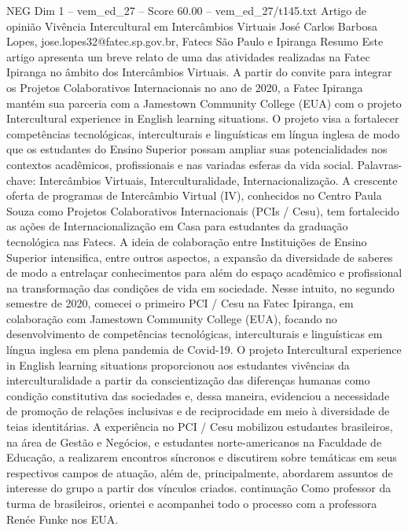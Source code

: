 \begin{textsample}{NEG Dim 1 – vem\_ed\_27 – Score 60.00 – vem\_ed\_27/t145.txt}  \label{ex:f1_neg_172}
Artigo de opinião Vivência Intercultural em Intercâmbios Virtuais José Carlos Barbosa Lopes, jose.lopes32@fatec.sp.gov.br, Fatecs São Paulo e Ipiranga Resumo Este artigo apresenta um breve relato de uma das atividades realizadas na Fatec Ipiranga no âmbito dos Intercâmbios Virtuais.
A partir do convite para integrar os Projetos Colaborativos Internacionais no ano de 2020, a Fatec Ipiranga mantém sua parceria com a Jamestown Community College (EUA) com o projeto Intercultural experience in English learning situations.
O projeto visa a fortalecer competências tecnológicas, interculturais e linguísticas em língua inglesa de modo que os estudantes do Ensino Superior possam ampliar suas potencialidades nos contextos acadêmicos, profissionais e nas variadas esferas da vida social.
Palavras-chave: Intercâmbios Virtuais, Interculturalidade, Internacionalização.
A crescente oferta de programas de Intercâmbio Virtual (IV), conhecidos no Centro Paula Souza como Projetos Colaborativos Internacionais (PCIs / Cesu), tem fortalecido as ações de Internacionalização em Casa para estudantes da graduação tecnológica nas Fatecs.
A ideia de colaboração entre Instituições de Ensino Superior intensifica, entre outros aspectos, a expansão da diversidade de saberes de modo a entrelaçar conhecimentos para além do espaço acadêmico e profissional na transformação das condições de vida em sociedade.
Nesse intuito, no segundo semestre de 2020, comecei o primeiro PCI / Cesu na Fatec Ipiranga, em colaboração com Jamestown Community College (EUA), focando no desenvolvimento de competências tecnológicas, interculturais e linguísticas em língua inglesa em plena pandemia de Covid-19.
O projeto Intercultural experience in English learning situations proporcionou aos estudantes vivências da interculturalidade a partir da conscientização das diferenças humanas como condição constitutiva das sociedades e, dessa maneira, evidenciou a necessidade de promoção de relações inclusivas e de reciprocidade em meio à diversidade de teias identitárias.
A experiência no PCI / Cesu mobilizou estudantes brasileiros, na área de Gestão e Negócios, e estudantes norte-americanos na Faculdade de Educação, a realizarem encontros síncronos e discutirem sobre temáticas em seus respectivos campos de atuação, além de, principalmente, abordarem assuntos de interesse do grupo a partir dos vínculos criados. continuação Como professor da turma de brasileiros, orientei e acompanhei todo o processo com a professora Renée Funke nos EUA.

\end{textsample}
